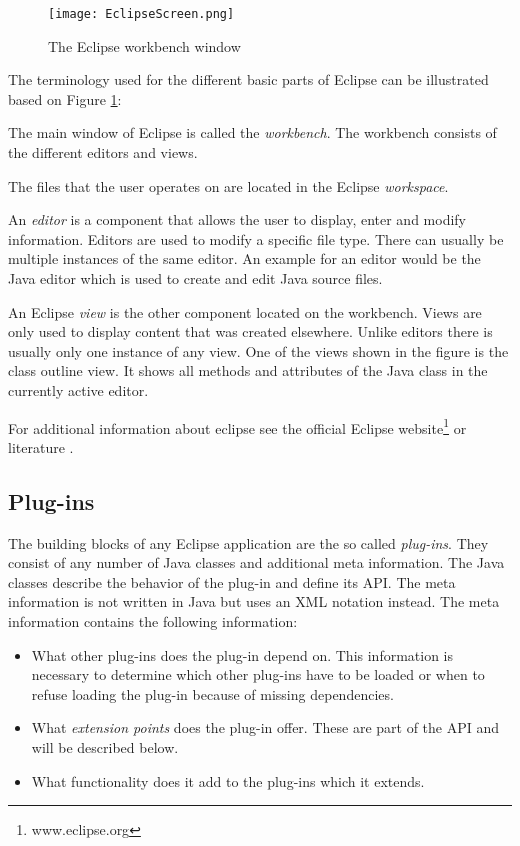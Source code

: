 \begin{figure}
  \centering
  \texttt{[image: EclipseScreen.png]}
  \caption[The Eclipse workbench window]%
  {The Eclipse workbench window\protect}
  \label{fig:EclipseScreen}
\end{figure}
The terminology used for the different basic parts of Eclipse can be illustrated based on Figure
\ref{fig:EclipseScreen}:
\begin{description}
 \item The main window of Eclipse is called the \textit{workbench}. The workbench consists of the 
different editors and views.
 \item The files that the user operates on are located in the Eclipse \textit{workspace}. 
 \item An \textit{editor} is a component that allows the user to display, enter and modify information.
Editors are used to modify a specific file type. There can usually be multiple instances of the same editor.
An example for an editor would be the Java editor which is used to create and edit Java source files.
 \item An Eclipse \textit{view} is the other component located on the workbench. Views are only used to
display content that was created elsewhere. Unlike editors there is usually only one instance of any view.
One of the views shown in the figure is the class outline view. It shows all methods and attributes of the 
Java class in the currently active editor.
\end{description}


For additional information about eclipse see the official Eclipse website\footnote{www.eclipse.org} or literature \cite{eclipsePlugins}.


\subsection{Plug-ins}
\label{section:ConfTechPlugins}
The building blocks of any Eclipse application are the so called \textit{plug-ins}. They
consist of any number of Java classes and additional meta information. The Java classes
describe the behavior of the plug-in and define its \ac{API}. The meta information is not written
in Java but uses an \ac{XML} notation instead. The meta information contains the following
information:
\begin{itemize}
 \item What other plug-ins does the plug-in depend on. This information is necessary to determine
which other plug-ins have to be loaded or when to refuse loading the plug-in because of missing
dependencies.
 \item What \textit{extension points} does the plug-in offer. These are part of the \ac{API} and
will be described below.
 \item What functionality does it add to the plug-ins which it extends.
\end{itemize}

